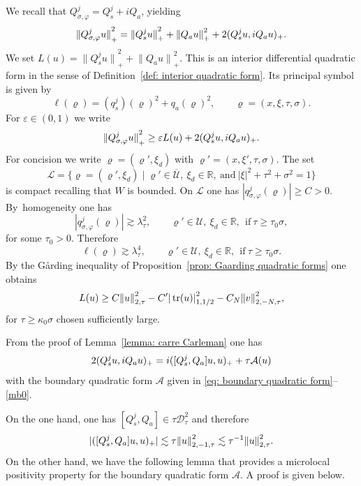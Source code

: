 \documentclass[JEP,XML,SOM,Unicode,published]{cedram}
\let\sep\mid
\theoremstyle{plain}
\theoremstyle{definition}
\def\R{\mathbb{R}}
\newcommand{\suff}{sufficiently\xspace}
\let\k\kappa
\let\y\varrho
\let \Re \relax
\DeclareMathOperator{\Re}{Re}
\newcommand{\ovl}[1]{\overline{#1}}
\newcommand{\inp}[2]{(#1, #2)}
\newcommand{\U}{\mathscr U}
\newcommand{\Norm}[2]{{\| #1 \|}_{#2}}
\newcommand{\norm}[2]{{|#1|}_{#2}}
\newcommand{\Normsc}[2]{{\| #1 \|}_{#2, \tau}}
\newcommand{\lsc}{\lambda_\tau}
\newcommand{\Dsc}{\mathscr{D}_{\tau}}
\newcommand{\Qconj}{Q_{\sigma,\varphi}}
\newcommand{\qconj}{q_{\sigma,\varphi}}
\newcommand{\Qs}{Q_{s}}
\newcommand{\Qa}{Q_{a}}
\DeclareMathOperator{\trace}{tr}
\begin{document}
We recall that $\Qconj^j=\Qs^j+i\Qa$, yielding
\begin{equation*}
\Norm{\Qconj^j u}{+}^2
=\Norm{\Qs^j u}{+}^2 +\Norm{\Qa u}{+}^2
+2\Re \inp{\Qs^ju}{i\Qa u}_+.
\end{equation*}
We set $L(u)=\Norm{\Qs^ju}{+}^2+\Norm{\Qa u}{+}^2$.
This is an interior differential quadratic form in the sense of Definition~\ref{def: interior quadratic form}. Its principal symbol is given by
\begin{equation*}
\ell(\y)=(q^j_s)(\y)^2+q_a(\y)^2, \qquad \y= (x,\xi,\tau,\sigma).
\end{equation*}
For $\varepsilon\in (0,1)$ we write
\begin{equation}\label{mb1}
\Norm{\Qconj^ju}{+}^2\geq \varepsilon L(u)
+ 2\Re \inp{\Qs^ju}{i\Qa u}_+.
\end{equation}
For concision we write $\y = (\y',\xi_d)$ with $\y' = (x,\xi',\tau,\sigma)$.
The set
\begin{equation*}
\mathscr{L}
=\{\y = (\y',\xi_d)\sep \y' \in \ovl{\U},\
\xi_d\in\R, \ \text{and}\ |\xi|^2+\tau^2+\sigma^2=1\}
\end{equation*}
is compact recalling that $W$ is bounded.
On $\mathscr{L}$ one has $|\qconj^j(\y)|\geq C>0$. By~homo\-geneity one has
\begin{equation}\label{mb2}
|\qconj^j(\y)|\gtrsim \lsc^2, \qquad
\y' \in \U, \ \xi_d \in \R, \ \ \text{if} \ \tau \geq \tau_0 \sigma,
\end{equation}
for some $\tau_0>0$.
Therefore
\begin{equation}\label{mb3}
\ell(\y) \gtrsim \lsc^4,
\qquad \y' \in \U, \ \xi_d \in \R, \ \ \text{if} \ \tau \geq \tau_0 \sigma.
\end{equation}
By the G\aa rding inequality of Proposition~\ref{prop: Gaarding quadratic forms} one obtains
\begin{equation}
\label{mb4}
\Re L(u)\geq
C\Normsc{u}{2}^2-C' \norm{\trace(u)}{1,1/2}^2-C_N\Normsc{v}{2,-N}^2,
\end{equation}
for $\tau\geq \k_0\sigma$ chosen \suff
large.

From the proof of Lemma~\ref{lemma: carre Carleman} one has
\begin{equation}
\label{eq: lemma: carre Carleman}
2\Re \inp{\Qs^ju}{i\Qa u}_+
= i \inp{[\Qs^j,\Qa]u}{u}_+
+\tau\mathcal{A}(u)
\end{equation}
with the boundary quadratic form $\mathcal{A}$ given in \eqref{eq:
boundary quadratic form}--\eqref{mb0}.

On the one hand, one has $[\Qs^j,\Qa]\in\tau\Dsc^2$ and therefore
\begin{equation}\label{mb5}
|\Re \inp{[\Qs^j,\Qa]u}{u}_+|
\lesssim \tau \Normsc{u}{2,-1}^2
\lesssim \tau^{-1}\Normsc{u}{2}^2.
\end{equation}
On the other hand, we have the following lemma that provides a
microlocal positivity property for the boundary quadratic form $\mathcal{A}$. A proof is given
below.
\end{document}
